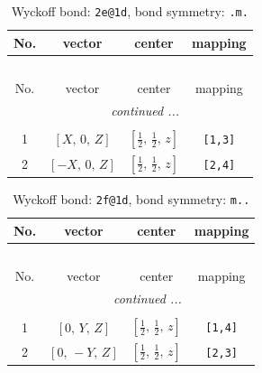 \documentclass[fleqn,8pt]{jsarticle}
\begin{document}
\renewcommand{\arraystretch}{1.2}
\begin{longtable}{cccc}
\caption{Wyckoff bond: {\tt 2e@1d}, bond symmetry: {\tt .m.}}
 \\
 \hline \hline
No. & vector & center & mapping \\ \hline \endfirsthead

\multicolumn{3}{l}{\tablename\ \thetable{}} \\
 \hline \hline
No. & vector & center & mapping \\ \hline \endhead

 \hline \hline
\multicolumn{3}{r}{\footnotesize\it continued ...} \\ \endfoot

 \hline \hline
\multicolumn{3}{r}{} \\ \endlastfoot

1 & $\left[ X,\, 0,\, Z \right]$ & $\left[ \frac{1}{2},\, \frac{1}{2},\, z \right]$ & {\tt [1,3]} \\ \hline
2 & $\left[ - X,\, 0,\, Z \right]$ & $\left[ \frac{1}{2},\, \frac{1}{2},\, z \right]$ & {\tt [2,4]} \\
\end{longtable}
\renewcommand{\arraystretch}{1.2}
\begin{longtable}{cccc}
\caption{Wyckoff bond: {\tt 2f@1d}, bond symmetry: {\tt m..}}
 \\
 \hline \hline
No. & vector & center & mapping \\ \hline \endfirsthead

\multicolumn{3}{l}{\tablename\ \thetable{}} \\
 \hline \hline
No. & vector & center & mapping \\ \hline \endhead

 \hline \hline
\multicolumn{3}{r}{\footnotesize\it continued ...} \\ \endfoot

 \hline \hline
\multicolumn{3}{r}{} \\ \endlastfoot

1 & $\left[ 0,\, Y,\, Z \right]$ & $\left[ \frac{1}{2},\, \frac{1}{2},\, z \right]$ & {\tt [1,4]} \\ \hline
2 & $\left[ 0,\, - Y,\, Z \right]$ & $\left[ \frac{1}{2},\, \frac{1}{2},\, z \right]$ & {\tt [2,3]} \\
\end{longtable}
\renewcommand{\arraystretch}{1.2}
\end{document}
